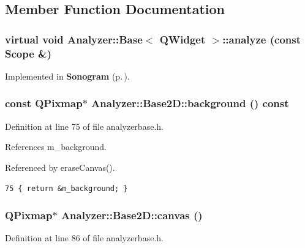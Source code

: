 \subsection{Member Function Documentation}
\subsubsection{\setlength{\rightskip}{0pt plus 5cm}virtual void {\bf Analyzer::Base}$<$ {\bf QWidget}  $>$::analyze (const {\bf Scope} \&)\hspace{0.3cm}{\tt  [protected, pure virtual, inherited]}}\label{classAnalyzer_1_1Base_Analyzer_1_1Baseb3}




Implemented in {\bf Sonogram} {\rm (p.\,\pageref{classSonogram_Sonograma3})}.
\subsubsection{\setlength{\rightskip}{0pt plus 5cm}const QPixmap$\ast$ Analyzer::Base2D::background () const\hspace{0.3cm}{\tt  [inline]}}\label{classAnalyzer_1_1Base2D_Sonograma6}




Definition at line 75 of file analyzerbase.h.

References m\_\-background.

Referenced by erase\-Canvas().



\footnotesize\begin{verbatim}75 { return &m_background; }
\end{verbatim}\normalsize 
{}
\subsubsection{\setlength{\rightskip}{0pt plus 5cm}QPixmap$\ast$ Analyzer::Base2D::canvas ()\hspace{0.3cm}{\tt  [inline, protected]}}\label{classAnalyzer_1_1Base2D_Sonogramb0}




Definition at line 86 of file analyzerbase.h.

